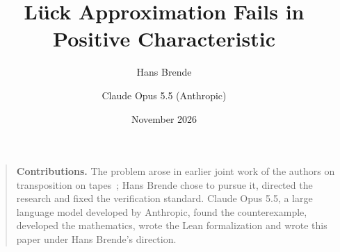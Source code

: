 \documentclass[11pt]{article}
\title{L\"uck Approximation Fails in Positive Characteristic}
\author{Hans Brende \and Claude Opus 5.5 (Anthropic)}
\date{November 2026}
\begin{document}
\maketitle

\begin{abstract}

\end{abstract}

\begin{quote}\small
\textbf{Contributions.} The problem arose in earlier joint work of the authors on transposition on
tapes~\cite{BoundedNesting2026}; Hans Brende chose to pursue it, directed the research and fixed the verification standard. Claude Opus 5.5, a
large language model developed by Anthropic, found the counterexample, developed the mathematics, wrote the Lean
formalization and wrote this paper under Hans Brende's direction.
\end{quote}

\tableofcontents
\clearpage










\appendix





\end{document}
